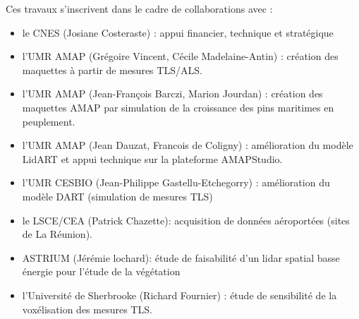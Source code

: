 \documentclass[a4paper,11pt]{article}
\begin{document}
\vspace{0.8cm}

Ces travaux s'inscrivent dans le cadre de collaborations avec :
\begin{itemize}
\item le CNES (Josiane Costeraste) : appui financier, technique et stratégique
\item l'UMR AMAP (Grégoire Vincent, Cécile Madelaine-Antin) : création des maquettes à partir de mesures TLS/ALS.
\item l'UMR AMAP (Jean-François Barczi, Marion Jourdan) : création des maquettes AMAP par simulation de la croissance des pins maritimes en peuplement.
\item l'UMR AMAP (Jean Dauzat, Francois de Coligny) : amélioration du modèle LidART et appui technique sur la plateforme AMAPStudio.
\item l'UMR CESBIO (Jean-Philippe Gastellu-Etchegorry) : amélioration du modèle DART (simulation de mesures TLS)
\item le LSCE/CEA (Patrick Chazette): acquisition de données aéroportées (sites de La Réunion).
\item ASTRIUM (Jérémie lochard): étude de faisabilité d'un lidar spatial basse énergie pour l'étude de la végétation
\item l'Université de Sherbrooke (Richard Fournier) : étude de sensibilité de la voxélisation des mesures TLS.
\end{itemize}
\end{document}
